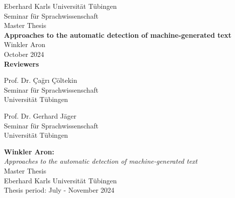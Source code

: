 \documentclass[a4paper,UKenglish,compactauthor]{lipics-v2021}
\title{\thesisTitle}
\newcommand{\authorName}{Winkler Aron}
\newcommand{\thesisTitle}{Approaches to the automatic detection of
machine-generated text}
\newcommand{\thesisDate}{October 2024}
\begin{document}

\begin{titlepage}
  \begin{center}
    {\LARGE Eberhard Karls Universität Tübingen}\\
    {\large Seminar für Sprachwissenschaft \\[4cm]}
    {\huge Master Thesis\\[2cm]}
    {\Large\bf  \thesisTitle\\[1.5cm]}
    {\large \authorName}\\[0.5cm]
    \thesisDate\\[4cm]
    {\small\bf Reviewers}\\[0.5cm]
    \parbox{7cm}%
    {\begin{center}{\large Prof. Dr. Çağrı Çöltekin}\\
        {\footnotesize Seminar für Sprachwissenschaft \\
        Universität Tübingen\vspace{0.4cm}}\end{center}}\hfill\parbox{7cm}%
    {\begin{center}
        {\large Prof. Dr. Gerhard Jäger}\\
        {\footnotesize Seminar für Sprachwissenschaft \\
        Universität Tübingen}\end{center}
    }
  \end{center}
\end{titlepage}


\thispagestyle{empty}
\vspace*{\fill}
\begin{minipage}{11.2cm}
  \textbf{\authorName:}\\
  \emph{\thesisTitle}\\ Master Thesis\\
  Eberhard Karls Universität Tübingen\\
  Thesis period: July - November 2024
\end{minipage}
\newpage

\end{document}
